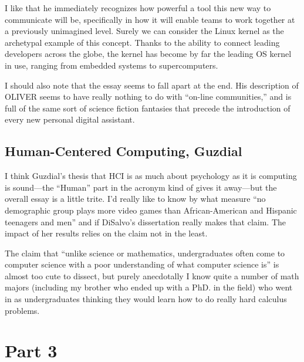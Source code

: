 \documentclass{abrice}
\begin{document}
I like that he immediately recognizes how powerful a tool this new way to
communicate will be, specifically in how it will enable teams to work together
at a previously unimagined level. Surely we can consider the Linux kernel as the
archetypal example of this concept. Thanks to the ability to connect leading
developers across the globe, the kernel has become by far the leading OS kernel
in use, ranging from embedded systems to supercomputers.

I should also note that the essay seems to fall apart at the end. His
description of \textsc{OLIVER} seems to have really nothing to do with ``on-line
communities,'' and is full of the same sort of science fiction fantasies that
precede the introduction of every new personal digital assistant.

\subsection{Human-Centered Computing, Guzdial}

I think Guzdial's thesis that HCI is as much about psychology as it is computing
is sound---the ``Human'' part in the acronym kind of gives it away---but the
overall essay is a little trite. I'd really like to know by what measure ``no
demographic group plays more video games than African-American and Hispanic
teenagers and men'' and if DiSalvo's dissertation really makes that claim. The
impact of her results relies on the claim not in the least.

The claim that ``unlike science or mathematics, undergraduates often come to
computer science with a poor understanding of what computer science is'' is
almost too cute to dissect, but purely anecdotally I know quite a number of math
majors (including my brother who ended up with a PhD. in the field) who went in
as undergraduates thinking they would learn how to do really hard calculus
problems.

\newpage

\section{Part 3}
\end{document}
